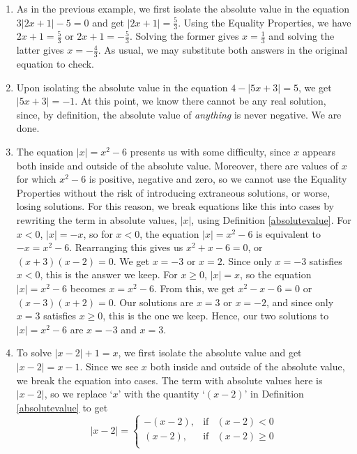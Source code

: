\begin{ex}
\begin{enumerate}
\item As in the previous example, we first isolate the absolute value in the equation $3|2x+1| - 5 = 0$ and get $|2x+1| = \frac{5}{3}$.  Using the Equality Properties, we have $2x+1 = \frac{5}{3}$ or $2x+1 = -\frac{5}{3}$.  Solving the former gives $x = \frac{1}{3}$ and solving the latter gives $x = -\frac{4}{3}$.  As usual, we may substitute both answers in the original equation to check.

\item  Upon isolating the absolute value in the equation $4 - |5x+3| = 5$, we get $|5x+3| = -1$.  At this point, we know there cannot be any real solution, since, by definition, the absolute value of \textit{anything} is never negative.  We are done. 


\item  The equation  $|x| = x^2-6$ presents us with some difficulty, since $x$ appears both inside and outside of the absolute value. Moreover, there are values of $x$ for which $x^2-6$ is positive, negative and zero, so we cannot use the Equality Properties without the risk of introducing extraneous solutions, or worse, losing solutions.  For this reason, we break equations like this into cases  by rewriting the term in absolute values, $|x|$, using Definition \ref{absolutevalue}.  For $x < 0$, $|x| = -x$, so for $x < 0$, the equation $|x| = x^2-6$ is equivalent to $-x = x^2-6$.  Rearranging this gives us $x^2+x-6 = 0$, or $(x+3)(x-2) = 0$.  We get $x = -3$ or $x=2$.  Since only $x=-3$ satisfies $x<0$, this is the answer we keep. For $x \geq 0$, $|x| = x$, so the equation $|x| = x^2-6$ becomes $x = x^2-6$.  From this, we get $x^2-x-6 =0$ or $(x-3)(x+2) = 0$.  Our solutions are $x=3$ or $x = -2$, and since only $x=3$ satisfies $x \geq 0$, this is the one we keep.  Hence, our two solutions to $|x| = x^2-6$ are $x=-3$ and $x=3$.

\item  To solve $|x-2| + 1 = x$, we first isolate the absolute value and get $|x-2| = x-1$.  Since we see $x$ both inside and outside of the absolute value, we break the equation into cases.  The term with absolute values here is $|x-2|$, so we replace `$x$' with the quantity `$(x-2)$' in Definition \ref{absolutevalue} to get \[ |x-2| = \left\{ \begin{array}{rcl} -(x-2), & \mbox{if} & (x-2) < 0  \\ (x-2), & \mbox{if} & (x-2) \geq 0 \\ \end{array} \right.\]


\end{enumerate}
\end{ex}

